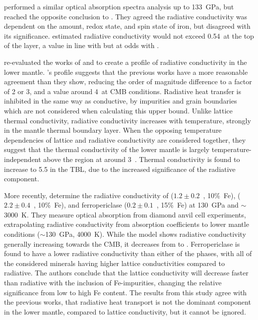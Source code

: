 \citet{Goncharov2008} performed a similar optical absorption spectra analysis up to 133~GPa, but reached the opposite conclusion to \citet{Keppler2008}. They agreed the radiative conductivity was dependent on the amount, redox state, and spin state of iron, but disagreed with its significance. \citet{Goncharov2008} estimated radiative conductivity would not exceed 0.54~\wmks at the top of the \ddds layer, a value in line with \citet{Hofmeister1999} but at odds with \citet{Keppler2008}. 

\citet{Tang2014} re-evaluated the works of \citet{Keppler2008} and \citet{Goncharov2008} to create a profile of radiative conductivity in the lower mantle. \citeauthor{Tang2014}'s profile suggests that the previous works have a more reasonable agreement than they show, reducing the order of magnitude difference to a factor of 2 or 3, and a value around 4~\wmk at CMB conditions. Radiative heat transfer is inhibited in the same way as conductive, by impurities and grain boundaries which are not considered when calculating this upper bound. Unlike lattice thermal conductivity, radiative conductivity increases with temperature, strongly in the mantle thermal boundary layer. When the opposing temperature dependencies of lattice and radiative conductivity are considered together, they suggest that the thermal conductivity of the lower mantle is largely temperature-independent above the \ddds region at around 3~\wmk. Thermal conductivity is found to increase to 5.5 \wmks in the TBL, due to the increased significance of the radiative component.

More recently, \citet{Lobanov2017} determine the radiative conductivity of \ppvs ($1.2\pm0.2$~\wmk, 10\%~Fe), \bdgs ($2.2\pm0.4$~\wmk, 10\%~Fe), and ferropericlase ($0.2\pm0.1$~\wmk, 15\%~Fe) at 130~GPa and $\sim$3000~K. They measure optical absorption from diamond anvil cell experiments, extrapolating radiative conductivity from absorption coefficients to lower mantle conditions ($\sim$130~GPa, 4000~K). While the model shows radiative conductivity generally increasing towards the CMB, it decreases from \bdgs to \ppv. Ferropericlase is found to have a lower radiative conductivity than either of the \mgfesios phases, with all of the considered minerals having higher lattice conductivities compared to radiative. The authors conclude that the lattice conductivity will decrease faster than radiative with the inclusion of Fe-impurities, changing the relative significance from low to high Fe content. The results from this study agree with the previous works, that radiative heat transport is not the dominant component in the lower mantle, compared to lattice conductivity, but it cannot be ignored.

